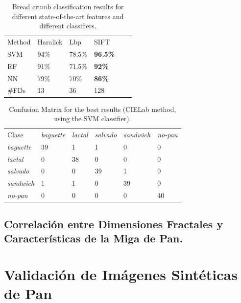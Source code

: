 \documentclass[spanish,a4paper,11pt,oneside,links]{report}
\begin{document}
\begin{table}[h!]
\caption{Bread crumb classification results for different state-of-the-art features and different classifiers.}
\label{tab:other}       %
\begin{tabular}{llllll}
\hline\noalign{\smallskip}
Method & Haralick & Lbp & SIFT\\ %
\noalign{\smallskip}\hline\noalign{\smallskip}
SVM & 94\% & 78.5\% & \textbf{96.5\%} \\ %
RF  & 91\% & 71.5\% & \textbf{92\%} \\ %
NN & 79\% & 70\% & \textbf{86\%} \\ %
\noalign{\smallskip}\hline
\#FDs & 13 & 36 & 128 \\
\hline
\end{tabular}
\end{table}

\begin{table}[h!]
\caption{Confusion Matrix for the best results (CIELab method, using the SVM classifier).}
\label{tab:confusionmatrix}       %
\begin{tabular}{llllll}
\hline\noalign{\smallskip}
Clase&{\em baguette} & {\em lactal} & {\em salvado} &{\em sandwich}&{\em no-pan} \\
\noalign{\smallskip}\hline\noalign{\smallskip}
{\em baguette} & 39& 1 &1 &0 &0 \\
{\em lactal} & 0& 38 &0 &0 &0  \\
{\em salvado} & 0& 0 &39 &1 &0  \\
{\em sandwich} & 1& 1 &0 &39 &0  \\
{\em no-pan} & 0& 0 &0 &0 &40  \\
\hline
\end{tabular}
\end{table}


\subsection{Correlación entre Dimensiones Fractales y Características de la Miga de Pan.}

\section{Validación de Imágenes Sintéticas de Pan}
\end{document}
